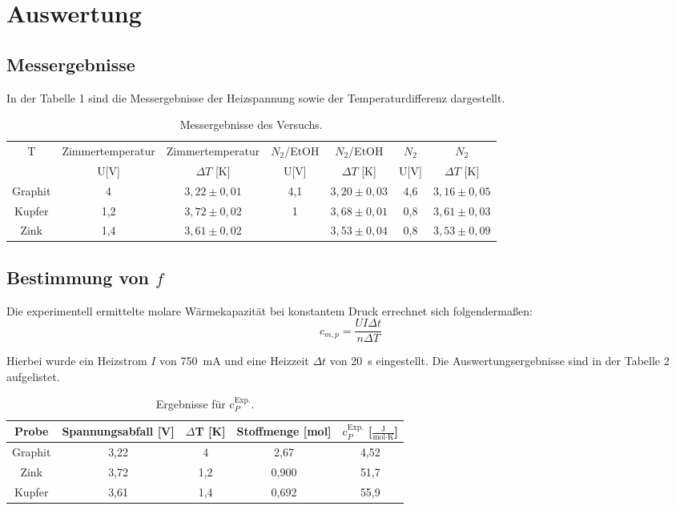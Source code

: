 \documentclass[12pt,a4paper,titlepage,headinclude,bibtotoc]{scrartcl}
\begin{document}
\section{Auswertung}


\subsection{Messergebnisse}
In der Tabelle 1 sind die Messergebnisse der Heizspannung sowie der Temperaturdifferenz dargestellt.
\begin{table}[h!]
\centering
\caption{Messergebnisse des Versuchs.}
\begin{tabular}{c|c|c|c|c|c|c}
T & Zimmertemperatur &Zimmertemperatur& $N_2$/EtOH& $N_2$/EtOH& $N_2$& $N_2$\\ 
& U[V]& $\Delta T$ [K]&U[V]& $\Delta T$ [K]&U[V]& $\Delta T$ [K]\\
\hline
Graphit & 4 & $3,22\pm0,01$ & 4,1 &$3,20\pm0,03$&4,6&$3,16\pm0,05$\\  
Kupfer & 1,2 & $3,72\pm0,02$ & 1 &$3,68\pm 0,01$&0,8&$3,61\pm0,03$\\ 
Zink & 1,4 & $3,61\pm 0,02$ & &$3,53\pm0,04$&0,8&$3,53\pm 0,09$ \\ 
\end{tabular} 
\end{table}
\FloatBarrier
\subsection{Bestimmung von $f$}

Die experimentell ermittelte molare Wärmekapazität bei konstantem Druck errechnet sich folgendermaßen:\\

\begin{equation}
c_{m,p} = \frac{UI\Delta t}{n\Delta T}
\end{equation}

Hierbei wurde ein Heizstrom $I$ von 750~mA und eine Heizzeit $\Delta t$ von 20~s eingestellt. Die Auswertungsergebnisse sind in der Tabelle 2 aufgelistet.
\begin{table}[h!]
\centering
\caption{Ergebnisse für $\text{c}_P^{\text{Exp.}}$.}
\begin{tabular}{c|c|c|c|c}
Probe& Spannungsabfall [V] & $\Delta$T [K]& Stoffmenge [mol] &  $\text{c}_P^{\text{Exp.}}$ [$\frac{\text{J}}{\text{mol}\cdot\text{K}}$]\\
\hline
Graphit & 3,22&4 &2,67 &4,52 \\
\hline
Zink & 3,72 & 1,2&0,900&51,7  \\
\hline
Kupfer & 3,61& 1,4& 0,692 &55,9\\
\end{tabular}
\end{table}
\FloatBarrier 
\end{document}
